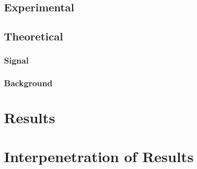 \subsection{Experimental}
\subsection{Theoretical}
\subsubsection{Signal}
\subsubsection{Background}

\section{Results}

\section{Interpenetration of Results}
